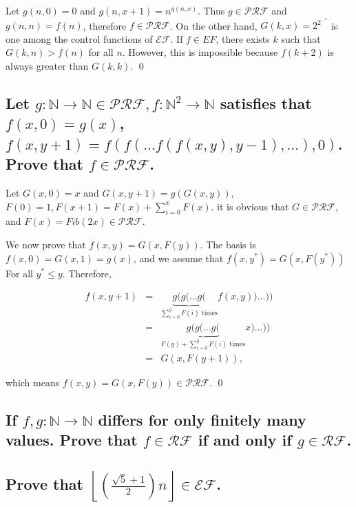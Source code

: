 \documentclass[11pt]{article}
\newcommand{\EF}{\mathcal{EF}}
\newcommand{\PRF}{\mathcal{PRF}}
\newcommand{\RF}{\mathcal{RF}}
\begin{document}
\begin{pf} \rm
 Let $g(n, 0) = 0$ and 
 $g(n, x + 1) = n^{ g(n, x)}$. Thus $g\in \PRF$ and $g(n, n) = f(n)$,
 therefore $f\in\PRF$. On the other hand, $G(k, x) = 2^{2^{\ldots^x}}$ is
 one among the control functions of $\EF$. If $f\in EF$, there exists
 $k$ such that $G(k, n) > f(n)$ for all $n$. However, this is impossible
 because $f(k + 2)$ is always greater than $G(k, k)$. \qed
\end{pf}


\subsection{Let $g:\mathbb{N}\to\mathbb{N}\in\PRF,
f:\mathbb{N}^2\to\mathbb{N}$ satisfies that
$f(x,0) = g(x)$, $f(x, y + 1) = f(f(\ldots f(f(x, y), y - 1), \ldots),0)$.
Prove that $f\in\PRF$.}

\begin{pf} \rm
 Let $G(x, 0) = x$ and $G(x, y + 1) = g(G(x, y))$,
 $F(0) = 1, F(x + 1) = F(x) + \sum_{i = 0}^{x} F(x)$. it is obvious that
 $G\in\PRF$, and $F(x) = Fib(2x) \in \PRF$.
 
 We now prove that $f(x, y) = G(x, F(y))$.
 The basis is $f(x, 0) = G(x, 1) = g(x)$, and we assume that
 $f(x, y^*) = G(x, F(y^*))$ For all $y^* \leq y$. Therefore, 

\[
 \begin{array}{rcl}
 f(x, y + 1)  & = &  \underbrace{g(g(\ldots g(}_{\sum_{i = 0}^{y} F(i)\textrm{ times}}
   f(x, y) )\ldots )) \\
 & = & \underbrace{g(g(\ldots g(}_{F(y) + \sum_{i = 0}^{y} F(i)\textrm{ times}}
   x )\ldots )) \\
   & = & G(x, F(y + 1)),
  \end{array}
\]

\noindent which means $f(x, y) = G(x, F(y))\in \PRF$. \qed
\end{pf}


\subsection{If $f,g:\mathbb{N}\to\mathbb{N}$ differs for only finitely many
values. Prove that $f\in\RF$ if and only if $g\in\RF$. }


\subsection{Prove that $
\displaystyle\left\lfloor\left(\frac{\sqrt{5}+1}{2}\right)n\right\rfloor \in \EF$.}
\end{document}
